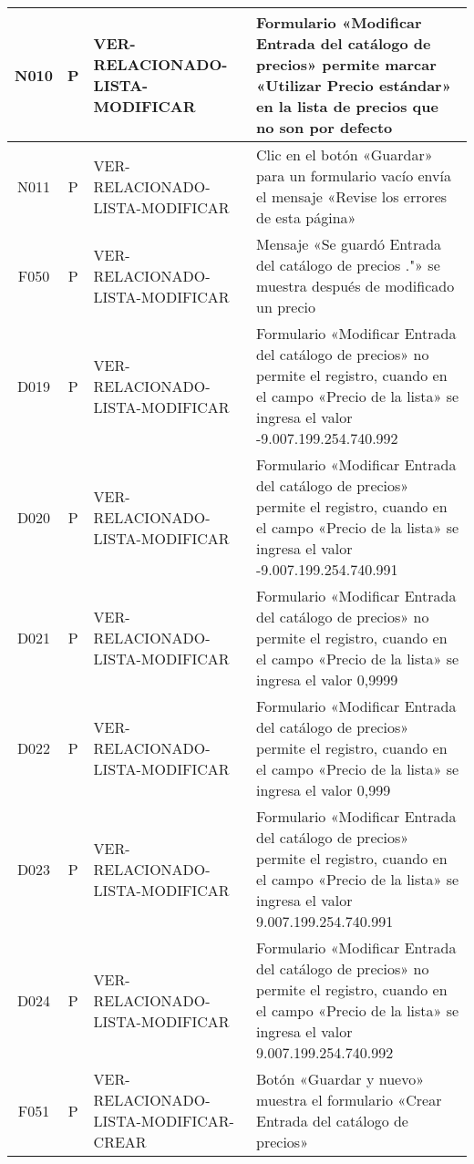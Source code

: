 \begin{landscape}
{\begin{longtable}[htb]{|c|c|p{3.8cm}|p{15.2cm}|}
\scriptsize{N010} & \scriptsize{P} & \scriptsize{VER-RELACIONADO-LISTA-MODIFICAR} & \scriptsize{Formulario «Modificar Entrada del catálogo de precios» permite marcar «Utilizar Precio estándar» en la lista de precios que no son por defecto} \\ \hline
\scriptsize{N011} & \scriptsize{P} & \scriptsize{VER-RELACIONADO-LISTA-MODIFICAR} & \scriptsize{Clic en el botón «Guardar» para un formulario vacío envía el mensaje «Revise los errores de esta página»} \\ \hline
\scriptsize{F050} & \scriptsize{P} & \scriptsize{VER-RELACIONADO-LISTA-MODIFICAR} & \scriptsize{Mensaje «Se guardó Entrada del catálogo de precios ."» se muestra después de modificado un precio} \\ \hline
\scriptsize{D019} & \scriptsize{P} & \scriptsize{VER-RELACIONADO-LISTA-MODIFICAR} & \scriptsize{Formulario «Modificar Entrada del catálogo de precios» no permite el registro, cuando en el campo «Precio de la lista» se ingresa el valor -9.007.199.254.740.992} \\ \hline
\scriptsize{D020} & \scriptsize{P} & \scriptsize{VER-RELACIONADO-LISTA-MODIFICAR} & \scriptsize{Formulario «Modificar Entrada del catálogo de precios» permite el registro, cuando en el campo «Precio de la lista» se ingresa el valor -9.007.199.254.740.991} \\ \hline
\scriptsize{D021} & \scriptsize{P} & \scriptsize{VER-RELACIONADO-LISTA-MODIFICAR} & \scriptsize{Formulario «Modificar Entrada del catálogo de precios» no permite el registro, cuando en el campo «Precio de la lista» se ingresa el valor 0,9999} \\ \hline
\scriptsize{D022} & \scriptsize{P} & \scriptsize{VER-RELACIONADO-LISTA-MODIFICAR} & \scriptsize{Formulario «Modificar Entrada del catálogo de precios» permite el registro, cuando en el campo «Precio de la lista» se ingresa el valor 0,999} \\ \hline
\scriptsize{D023} & \scriptsize{P} & \scriptsize{VER-RELACIONADO-LISTA-MODIFICAR} & \scriptsize{Formulario «Modificar Entrada del catálogo de precios» permite el registro, cuando en el campo «Precio de la lista» se ingresa el valor 9.007.199.254.740.991} \\ \hline
\scriptsize{D024} & \scriptsize{P} & \scriptsize{VER-RELACIONADO-LISTA-MODIFICAR} & \scriptsize{Formulario «Modificar Entrada del catálogo de precios» no permite el registro, cuando en el campo «Precio de la lista» se ingresa el valor 9.007.199.254.740.992} \\ \hline
\scriptsize{F051} & \scriptsize{P} & \scriptsize{VER-RELACIONADO-LISTA-MODIFICAR-CREAR} & \scriptsize{Botón «Guardar y nuevo» muestra el formulario «Crear Entrada del catálogo de precios»} \\ \hline

\end{longtable}}
\end{landscape}
